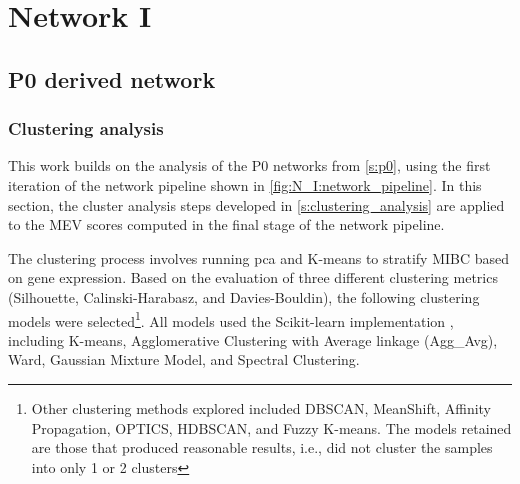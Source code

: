 \chapter{Network I}


\section{P0 derived network} \label{s:ap:P0}

\subsection{Clustering analysis} \label{s:ap:P0_cs_analysis}


This work builds on the analysis of the P0 networks from \cref{s:p0}, using the first iteration of the network pipeline shown in \cref{fig:N_I:network_pipeline}. In this section, the cluster analysis steps developed in \cref{s:clustering_analysis} are applied to the MEV scores computed in the final stage of the network pipeline.

The clustering process involves running \acrfull{pca} and K-means to stratify MIBC based on gene expression. Based on the evaluation of three different clustering metrics (Silhouette, Calinski-Harabasz, and Davies-Bouldin), the following clustering models were selected\footnote{Other clustering methods explored included DBSCAN, MeanShift, Affinity Propagation, OPTICS, HDBSCAN, and Fuzzy K-means. The models retained are those that produced reasonable results, i.e., did not cluster the samples into only 1 or 2 clusters}. All models used the Scikit-learn implementation \cite{Scikit-learn_undated-ax}, including K-means, Agglomerative Clustering with Average linkage (Agg\_Avg), Ward, Gaussian Mixture Model, and Spectral Clustering.

